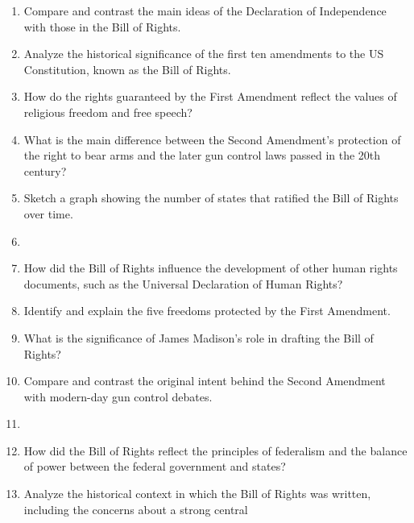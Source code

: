 \documentclass{article}
\begin{document}
\begin{enumerate}
\item Compare and contrast the main ideas of the Declaration of Independence with those in the Bill of Rights. \vspace{2cm} \item Analyze the historical significance of the first ten amendments to the US Constitution, known as the Bill of Rights. \vspace{2cm} \item How do the rights guaranteed by the First Amendment reflect the values of religious freedom and free speech? \vspace{2cm} \item What is the main difference between the Second Amendment's protection of the right to bear arms and the later gun control laws passed in the 20th century? \vspace{2cm} \item Sketch a graph showing the number of states that ratified the Bill of Rights over time. \vspace{2cm} \item {} \vspace{2cm} \item How did the Bill of Rights influence the development of other human rights documents, such as the Universal Declaration of Human Rights? \vspace{2cm} \item Identify and explain the five freedoms protected by the First Amendment. \vspace{2cm} \item What is the significance of James Madison's role in drafting the Bill of Rights? \vspace{2cm} \item Compare and contrast the original intent behind the Second Amendment with modern-day gun control debates. \vspace{2cm} \item {} \vspace{2cm} \item How did the Bill of Rights reflect the principles of federalism and the balance of power between the federal government and states? \vspace{2cm} \item Analyze the historical context in which the Bill of Rights was written, including the concerns about a strong central 
\end{enumerate}
\end{document}
